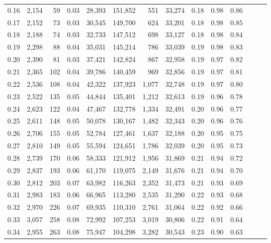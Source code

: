 \begin{tabular}{rrrrrrrrrrrrrr}
0.16 &  2,154 &     59 &  0.03 &   28,393 &  151,852 &     551 &  33,274 &  0.18 &  0.98 &      0.86 \\
0.17 &  2,152 &     73 &  0.03 &   30,545 &  149,700 &     624 &  33,201 &  0.18 &  0.98 &      0.85 \\
0.18 &  2,188 &     74 &  0.03 &   32,733 &  147,512 &     698 &  33,127 &  0.18 &  0.98 &      0.84 \\
0.19 &  2,298 &     88 &  0.04 &   35,031 &  145,214 &     786 &  33,039 &  0.19 &  0.98 &      0.83 \\
0.20 &  2,390 &     81 &  0.03 &   37,421 &  142,824 &     867 &  32,958 &  0.19 &  0.97 &      0.82 \\
0.21 &  2,365 &    102 &  0.04 &   39,786 &  140,459 &     969 &  32,856 &  0.19 &  0.97 &      0.81 \\
0.22 &  2,536 &    108 &  0.04 &   42,322 &  137,923 &   1,077 &  32,748 &  0.19 &  0.97 &      0.80 \\
0.23 &  2,522 &    135 &  0.05 &   44,844 &  135,401 &   1,212 &  32,613 &  0.19 &  0.96 &      0.78 \\
0.24 &  2,623 &    122 &  0.04 &   47,467 &  132,778 &   1,334 &  32,491 &  0.20 &  0.96 &      0.77 \\
0.25 &  2,611 &    148 &  0.05 &   50,078 &  130,167 &   1,482 &  32,343 &  0.20 &  0.96 &      0.76 \\
0.26 &  2,706 &    155 &  0.05 &   52,784 &  127,461 &   1,637 &  32,188 &  0.20 &  0.95 &      0.75 \\
0.27 &  2,810 &    149 &  0.05 &   55,594 &  124,651 &   1,786 &  32,039 &  0.20 &  0.95 &      0.73 \\
0.28 &  2,739 &    170 &  0.06 &   58,333 &  121,912 &   1,956 &  31,869 &  0.21 &  0.94 &      0.72 \\
0.29 &  2,837 &    193 &  0.06 &   61,170 &  119,075 &   2,149 &  31,676 &  0.21 &  0.94 &      0.70 \\
0.30 &  2,812 &    203 &  0.07 &   63,982 &  116,263 &   2,352 &  31,473 &  0.21 &  0.93 &      0.69 \\
0.31 &  2,983 &    183 &  0.06 &   66,965 &  113,280 &   2,535 &  31,290 &  0.22 &  0.93 &      0.68 \\
0.32 &  2,970 &    226 &  0.07 &   69,935 &  110,310 &   2,761 &  31,064 &  0.22 &  0.92 &      0.66 \\
0.33 &  3,057 &    258 &  0.08 &   72,992 &  107,253 &   3,019 &  30,806 &  0.22 &  0.91 &      0.64 \\
0.34 &  2,955 &    263 &  0.08 &   75,947 &  104,298 &   3,282 &  30,543 &  0.23 &  0.90 &      0.63 \\

\end{tabular}
